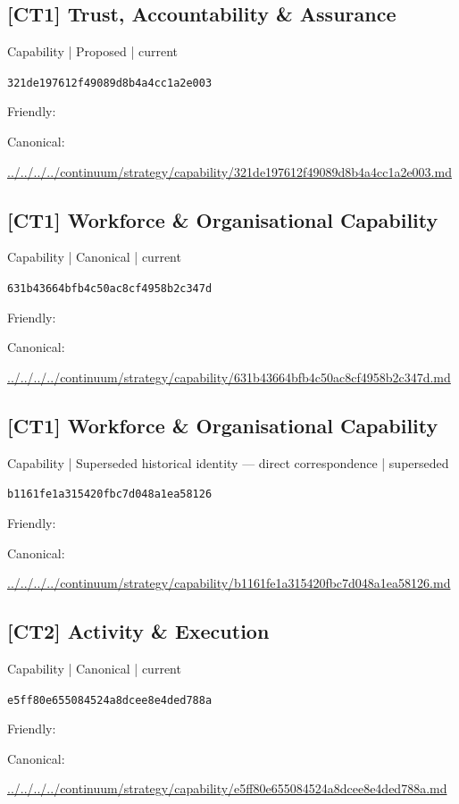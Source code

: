 \documentclass[10pt,a4paper]{article}
\begin{document}
\subsection*{[CT1] Trust, Accountability \& Assurance}
{\small Capability | Proposed | current}\par
\texttt{321de197612f49089d8b4a4cc1a2e003}\par
Friendly: \par
Canonical: \par
{\footnotesize\url{../../../../continuum/strategy/capability/321de197612f49089d8b4a4cc1a2e003.md}}\par
\subsection*{[CT1] Workforce \& Organisational Capability}
{\small Capability | Canonical | current}\par
\texttt{631b43664bfb4c50ac8cf4958b2c347d}\par
Friendly: \par
Canonical: \par
{\footnotesize\url{../../../../continuum/strategy/capability/631b43664bfb4c50ac8cf4958b2c347d.md}}\par
\subsection*{[CT1] Workforce \& Organisational Capability}
{\small Capability | Superseded historical identity — direct correspondence | superseded}\par
\texttt{b1161fe1a315420fbc7d048a1ea58126}\par
Friendly: \par
Canonical: \par
{\footnotesize\url{../../../../continuum/strategy/capability/b1161fe1a315420fbc7d048a1ea58126.md}}\par
\subsection*{[CT2] Activity \& Execution}
{\small Capability | Canonical | current}\par
\texttt{e5ff80e655084524a8dcee8e4ded788a}\par
Friendly: \par
Canonical: \par
{\footnotesize\url{../../../../continuum/strategy/capability/e5ff80e655084524a8dcee8e4ded788a.md}}\par
\end{document}
